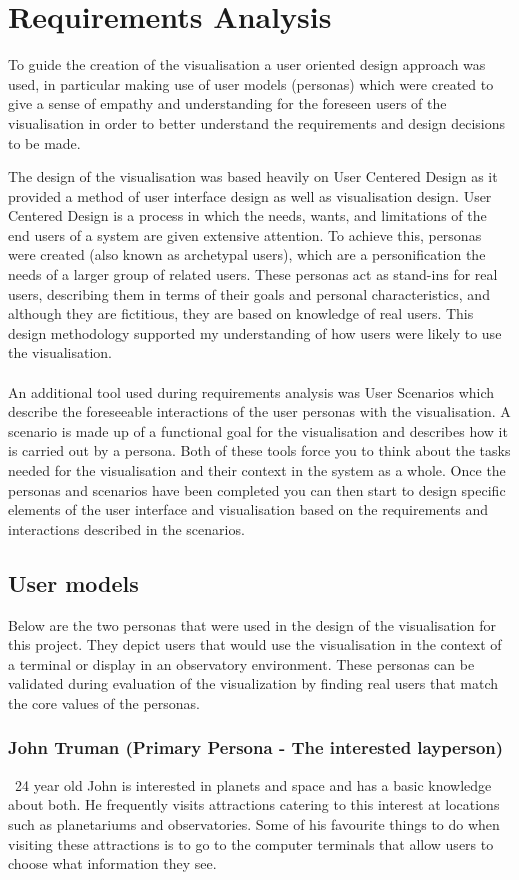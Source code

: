 \chapter{Requirements Analysis}\label{C:ra}
To guide the creation of the visualisation a user oriented design approach was used, in particular making use of user models (personas) which were created to give a sense of empathy and understanding for the foreseen users of the visualisation in order to better understand the requirements and design decisions to be made. 

The design of the visualisation was based heavily on User Centered Design as it provided a method of user interface design as well as visualisation design. User Centered Design is a process in which the needs, wants, and limitations of the end users of a system are given extensive attention. To achieve this, personas were created (also known as archetypal users), which are a personification the needs of a larger group of related users. These personas act as stand-ins for real users, describing them in terms of their goals and personal characteristics, and although they are fictitious, they are based on knowledge of real users. This design methodology supported my understanding of how users were likely to use the visualisation.
\\\\
An additional tool used during requirements analysis was User Scenarios which describe the foreseeable interactions of the user personas with the visualisation. A scenario is made up of a functional goal for the visualisation and describes how it is carried out by a persona. Both of these tools force you to think about the tasks needed for the visualisation and their context in the system as a whole. Once the personas and scenarios have been completed you can then start to design specific elements of the user interface and visualisation based on the requirements and interactions described in the scenarios.
\section{User models}
Below are the two personas that were used in the design of the visualisation for this project. They depict users that would use the visualisation in the context of a terminal or display in an observatory environment. These personas  can be validated during evaluation of the visualization by finding real users that match the core values of the personas.

\subsection{John Truman (Primary Persona - The interested layperson)}\
24 year old John is interested in planets and space and has a basic knowledge about both. He frequently visits attractions catering to this interest at locations such as planetariums and observatories. Some of his favourite things to do when visiting these attractions is to go to the computer terminals that allow users to choose what information they see.

